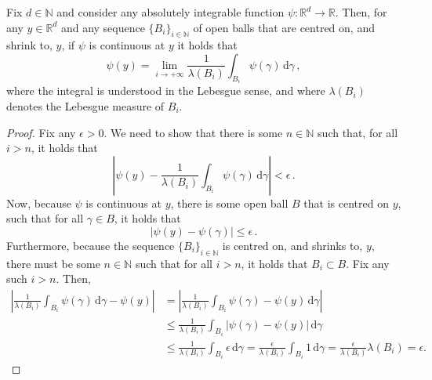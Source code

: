 \documentclass[twoside,11pt]{article}
\newcommand{\nats}{\mathbb{N}}
\newcommand{\reals}{\mathbb{R}}
\newcommand{\abs}[1]{\left\vert #1 \right\vert}
\begin{document}
\begin{lemma}\label{lemma:lebesgue_differentiation_theorem}
Fix $d\in\nats$ and consider any absolutely integrable function $\psi:\reals^d\to \reals$. Then, for any $y\in\reals^d$ and any sequence $\{B_i\}_{i\in\nats}$ of open balls that are centred on, and shrink to, $y$, if $\psi$ is continuous at $y$ it holds that
\begin{equation*}
\psi(y) = \lim_{i\to+\infty} \frac{1}{\lambda(B_i)}\int_{B_i}\psi(\gamma)\,\mathrm{d}\gamma\,,
\end{equation*}
where the integral is understood in the Lebesgue sense, and where $\lambda(B_i)$ denotes the Lebesgue measure of $B_i$.
\end{lemma}
\begin{proof}
Fix any $\epsilon>0$. We need to show that there is some $n\in\nats$ such that, for all $i>n$, it holds that
\begin{equation*}
\abs{\psi(y) - \frac{1}{\lambda(B_i)}\int_{B_i}\psi(\gamma)\,\mathrm{d}\gamma} < \epsilon\,.
\end{equation*}
Now, because $\psi$ is continuous at $y$, there is some open ball $B$ that is centred on $y$, such that for all $\gamma\in B$, it holds that
\begin{equation*}
\abs{\psi(y)-\psi(\gamma)} \leq \epsilon\,.
\end{equation*}
Furthermore, because the sequence $\{B_i\}_{i\in\nats}$ is centred on, and shrinks to, $y$, there must be some $n\in\nats$ such that for all $i>n$, it holds that $B_i\subset B$. Fix any such $i>n$. Then,
\begin{align*}
\abs{\frac{1}{\lambda(B_i)}\int_{B_i}\psi(\gamma)\,\mathrm{d}\gamma - \psi(y)} &= \abs{\frac{1}{\lambda(B_i)}\int_{B_i}\psi(\gamma) - \psi(y)\,\mathrm{d}\gamma} \\
 &\leq \frac{1}{\lambda(B_i)}\int_{B_i}\abs{\psi(\gamma) - \psi(y)}\,\mathrm{d}\gamma \\
 &\leq \frac{1}{\lambda(B_i)}\int_{B_i}\epsilon\,\mathrm{d}\gamma
 = \frac{\epsilon}{\lambda(B_i)}\int_{B_i}1\,\mathrm{d}\gamma
 = \frac{\epsilon}{\lambda(B_i)}\lambda(B_i)=\epsilon.
\end{align*}
\end{proof}
\end{document}

